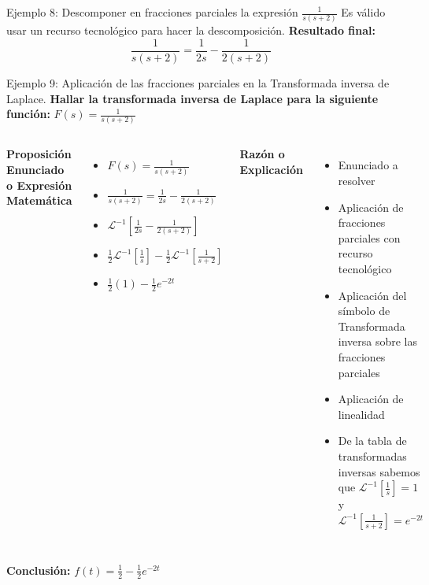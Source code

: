 \documentclass{beamer}
\begin{document}
\begin{frame}{Ejemplo 8: Descomponer en fracciones parciales la expresión $\frac{1}{s(s+2)}$}
    \centering
    Es válido usar un recurso tecnológico para hacer la descomposición. 
    \textbf{Resultado final:}
    \[
    \frac{1}{s(s+2)}=\frac{1}{2s}-\frac{1}{2(s+2)} \text{ }
    \]
\end{frame}

\begin{frame}{Ejemplo 9: Aplicación de las fracciones parciales en la Transformada inversa de Laplace.}
    \centering
    \textbf{Hallar la transformada inversa de Laplace para la siguiente función:} $F(s)=\frac{1}{s(s+2)}$ 

    \begin{columns}
        \textbf{Proposición Enunciado o Expresión Matemática}
        \begin{itemize}
            \item $F(s)=\frac{1}{s(s+2)}$
            \item $\frac{1}{s(s+2)} = \frac{1}{2s}-\frac{1}{2(s+2)}$
            \item $\mathcal{L}^{-1}\left[\frac{1}{2s}-\frac{1}{2(s+2)}\right]$
            \item $\frac{1}{2}\mathcal{L}^{-1}\left[\frac{1}{s}\right]-\frac{1}{2}\mathcal{L}^{-1}\left[\frac{1}{s+2}\right]$
            \item $\frac{1}{2}(1) - \frac{1}{2}e^{-2t}$
        \end{itemize}
        \textbf{Razón o Explicación}
        \begin{itemize}
            \item Enunciado a resolver 
            \item Aplicación de fracciones parciales con recurso tecnológico 
            \item Aplicación del símbolo de Transformada inversa sobre las fracciones parciales 
            \item Aplicación de linealidad 
            \item De la tabla de transformadas inversas sabemos que $\mathcal{L}^{-1}[\frac{1}{s}]=1$ y $\mathcal{L}^{-1}[\frac{1}{s+2}]=e^{-2t}$ 
        \end{itemize}
    \end{columns}
    \textbf{Conclusión:} $f(t)=\frac{1}{2}-\frac{1}{2}e^{-2t}$ 
\end{frame}
\end{document}
